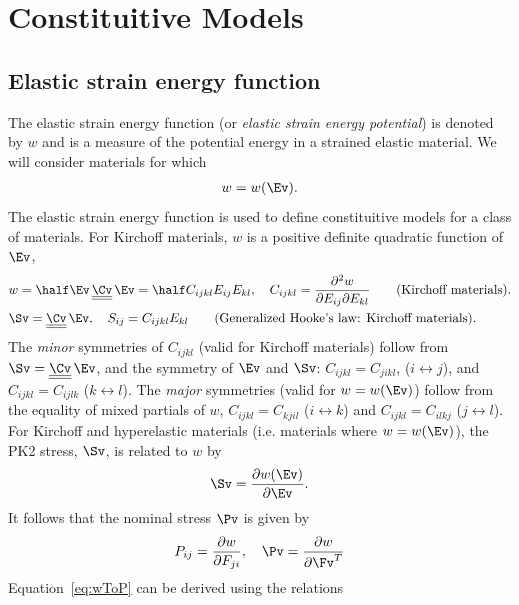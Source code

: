 \section{Constituitive Models} \label{sec:consituitiveModels}

\newcommand{\Cvv}{\underline{\underline{\Cv}}}
\subsection{Elastic strain energy function}

The elastic strain energy function (or {\em elastic strain energy potential}) is denoted by $w$ and is
a measure of the potential energy in a strained elastic material. We will consider
materials for which 
\begin{align*}
   w=w(\Ev).
\end{align*}
The elastic strain energy function is used to define constituitive models for a class of materials.
%
For Kirchoff materials, $w$ is a positive definite quadratic function of $\Ev$, 
\begin{align*}
&   w= \half \Ev \, \Cvv \, \Ev = \half C_{ijkl} E_{ij} E_{kl} , 
              \quad C_{ijkl}=\frac{\partial^2 w}{\partial E_{ij} \partial E_{kl}}
       \qquad\text{(Kirchoff materials)}.\\
&    \Sv = \Cvv\, \Ev , \quad S_{ij} = C_{ijkl} E_{kl}  \qquad\text{(Generalized Hooke's law: Kirchoff materials)}.
\end{align*}
The {\em minor} symmetries of $C_{ijkl}$ (valid for Kirchoff materials) follow from $\Sv = \Cvv\, \Ev$, and 
the symmetry of $\Ev$ and $\Sv$: $C_{ijkl}=C_{jikl}$, ($i\leftrightarrow j$), and $C_{ijkl}=C_{ijlk}$ ($k\leftrightarrow l$).
The {\em major} symmetries (valid for $w=w(\Ev)$) follow from the equality of mixed partials of $w$, $C_{ijkl}=C_{kjil}$ ($i\leftrightarrow k$)
 and $C_{ijkl}=C_{ilkj}$ ($j\leftrightarrow l$). 
%
For Kirchoff and hyperelastic materials (i.e. materials where $w=w(\Ev)$), the PK2 stress, $\Sv$, is related to $w$ by 
\begin{align*}
    \Sv = \frac{\partial w(\Ev)}{\partial\Ev}.
\end{align*}
It follows that the nominal stress $\Pv$ is given by 
\begin{align}
    P_{ij} = \frac{\partial w}{\partial F_{ji}}, \quad \Pv = \frac{\partial w}{\partial\Fv^T}  \label{eq:wToP}
\end{align}
Equation~\eqref{eq:wToP} can be derived using the relations
